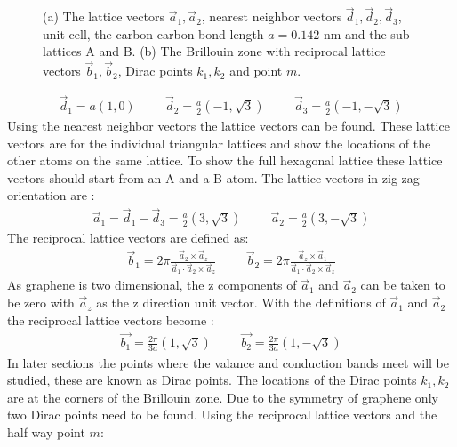 \begin{figure}[h]
\begin{subfigure}[h]{0.47\textwidth}
					\caption{}
				\end{subfigure}
				\caption{(a) The lattice vectors $\vec{a}_{1},\vec{a}_{2}$, nearest neighbor vectors $\vec{d}_{1},\vec{d}_{2},\vec{d}_{3}$, unit cell,  the carbon-carbon bond length $a=0.142$ nm and the sub lattices A and B. (b) The Brillouin zone with reciprocal lattice vectors $\vec{b}_{1},\vec{b}_{2}$, Dirac points $k_{1},k_{2}$ and point $m$.}
				\label{introduction-structure-zig}
			\end{figure}
			\begin{align}
				\vec{d}_{1}=a\left(1,0\right)\hspace{1cm}\vec{d}_{2}=\frac{a}{2}\left(-1,\sqrt{3}\right)\hspace{1cm}\vec{d}_{3}=\frac{a}{2}\left(-1,-\sqrt{3}\right)
			\end{align}
			Using the nearest neighbor vectors the lattice vectors can be found. These lattice vectors are for the individual triangular lattices and show the locations of the other atoms on the same lattice. To show the full hexagonal lattice these lattice vectors should start from an A and a B atom. The lattice vectors in zig-zag orientation are \cite{b1}:
			\begin{align}
				\vec{a}_{1}=\vec{d}_{1}-\vec{d}_{3}=\frac{a}{2}\left(3,\sqrt{3}\right)\hspace{1cm}\vec{a}_{2}=\frac{a}{2}\left(3,-\sqrt{3}\right)
			\end{align}
			The reciprocal lattice vectors are defined as:
			\begin{align}
				\vec{b}_{1}=2\pi\frac{\vec{a}_{2}\times\vec{a}_{z}}{\vec{a}_{1}\cdot\vec{a}_{2}\times\vec{a}_{z}}\hspace{1cm}\vec{b}_{2}=2\pi\frac{\vec{a}_{z}\times\vec{a}_{1}}{\vec{a}_{1}\cdot\vec{a}_{2}\times\vec{a}_{z}}
			\end{align}
			As graphene is two dimensional, the z components of $\vec{a}_{1}$ and $\vec{a}_{2}$ can be taken to be zero with $\vec{a}_{z}$ as the z direction unit vector. With the definitions of $\vec{a}_{1}$ and $\vec{a}_{2}$ the reciprocal lattice vectors become \cite{b1}:
			\begin{align}
				\vec{b_{1}}=\frac{2\pi}{3a}\left(1,\sqrt{3}\right)\hspace{1cm}\vec{b_{2}}=\frac{2\pi}{3a}\left(1,-\sqrt{3}\right)
			\end{align}
			In later sections the points where the valance and conduction bands meet will be studied, these are known as Dirac points. The locations of the Dirac points $k_{1}, k_{2}$ are at the corners of the Brillouin zone. Due to the symmetry of graphene only two Dirac points need to be found. Using the reciprocal lattice vectors and the half way point $m$:
